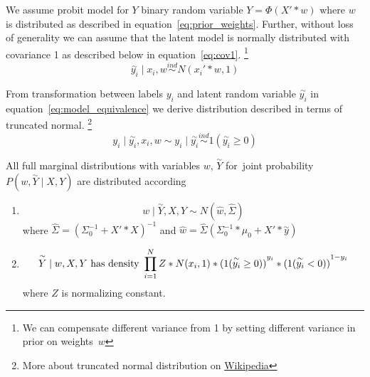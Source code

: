 We assume probit model for $Y$ binary random variable $ Y = \Phi(X' * w)$ where $w$ is distributed as described in equation~\ref{eq:prior_weights}.
Further, without loss of generality we can assume that the latent model is normally distributed with covariance 1 as described below in equation~\ref{eq:cov1}.
\footnote{We can compensate different variance from 1 by setting different variance in prior on weights~$w$ }
\begin{equation}\label{eq:cov1}
    \overset{\sim}{y_i} \mid x_i, w \overset{ind}{\sim} N(x_i' * w, 1)
\end{equation}

From transformation between labels $y_i$ and latent random variable $\overset{\sim}{y_i}$ in equation~\ref{eq:model_equivalence} we derive distribution described in terms of truncated normal.
\footnote{More about truncated normal distribution on \href{http://en.wikipedia.org/wiki/Truncated_normal_distribution}{Wikipedia}}
\begin{equation}
    y_i \mid \overset{\sim}{y_i}, x_i, w \sim y_i \mid \overset{\sim}{y_i} \overset{ind}{\sim} 1(\overset{\sim}{y_i} \ge 0)
\end{equation}

\begin{thm}
    All full marginal distributions with variables $w$, $\overset{\sim}{Y}$ for~joint probability $P(w, \overset{\sim}{Y} \mid X, Y)$ are distributed according
\begin{enumerate}
\item
    \begin{equation}\label{eq:margin_w}
    w \mid \overset{\sim}{Y}, X, Y \sim N(\hat{w},\hat{\Sigma})
    \end{equation} 
    where 
    $ \hat{\Sigma} = {(\Sigma_0^{-1} + X' * X)}^{-1} $ 
    and
    $ \hat{w} = \hat{\Sigma} ( \Sigma_0^{-1}*\mu_0 + X' * \overset{\sim}{y} ) $

\item 
    \begin{equation}\label{eq:margin_ytilda}
        \overset{\sim}{Y} \mid w, X, Y \text{ has density } \\
        \prod_{i=1}^{N} Z * N(x_i, 1) * {(1(\overset{\sim}{y_i} \ge 0))}^{y_i} * {(1(\overset{\sim}{y_i} < 0))}^{1-y_i}
    \end{equation} 
    where $Z$ is normalizing constant.
\end{enumerate}
\end{thm}

